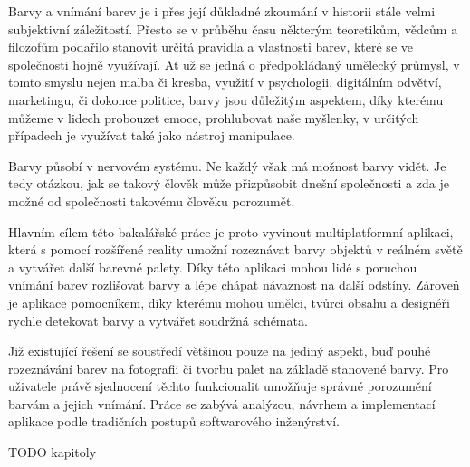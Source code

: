Barvy a vnímání barev je i přes její důkladné zkoumání v historii stále velmi subjektivní záležitostí. 
Přesto se v průběhu času některým teoretikům, vědcům a filozofům podařilo stanovit určitá pravidla a vlastnosti barev,
které se ve společnosti hojně využívají. Ať už se jedná o předpokládaný umělecký průmysl, v tomto smyslu 
nejen malba či kresba, využití v psychologii, digitálním odvětví, marketingu, či dokonce politice, barvy jsou 
důležitým aspektem, díky kterému můžeme v lidech probouzet emoce, prohlubovat naše myšlenky, v určitých případech 
je využívat také jako nástroj manipulace.

Barvy působí v nervovém systému. Ne každý však má možnost barvy vidět. Je tedy otázkou, jak se takový člověk může 
přizpůsobit dnešní společnosti a zda je možné od společnosti takovému člověku porozumět.

Hlavním cílem této bakalářské práce je proto vyvinout multiplatformní aplikaci, která s pomocí rozšířené reality umožní
rozeznávat barvy objektů v reálném světě a vytvářet další barevné palety. Díky této aplikaci mohou lidé s poruchou vnímání barev
rozlišovat barvy a lépe chápat návaznost na další odstíny. Zároveň je aplikace pomocníkem, díky kterému mohou umělci, tvůrci obsahu
a designéři rychle detekovat barvy a vytvářet soudržná schémata.

Již existující řešení se soustředí většinou pouze na jediný aspekt, buď pouhé rozeznávání barev na fotografii či tvorbu palet na základě stanovené barvy.
Pro uživatele právě sjednocení těchto funkcionalit umožňuje správné porozumění barvám a jejich vnímání. Práce se zabývá analýzou, návrhem a implementací 
aplikace podle tradičních postupů softwarového inženýrství.

TODO kapitoly
